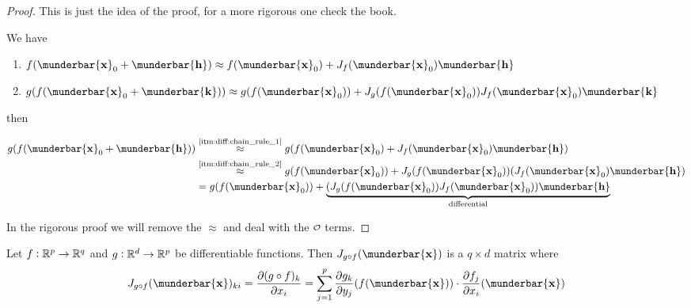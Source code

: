\documentclass[14pt]{extarticle}
\renewcommand{\vec}[1]{\munderbar{\mathbf{#1}}}
\begin{document}
\begin{proof}
    This is just the idea of the proof, for a more rigorous one check the book.

    We have
    \begin{enumerate}[label=(\roman*.)]
        \item \label{itm:diff:chain_rule_1} $f(\vec{x}_0 + \vec{h}) \approx f(\vec{x}_0) + J_f(\vec{x}_0) \vec{h}$
        \item \label{itm:diff:chain_rule_2} $g(f(\vec{x}_0 + \vec{k})) \approx g(f(\vec{x}_0)) + J_g(f(\vec{x}_0)) J_f(\vec{x}_0) \vec{k}$
    \end{enumerate}

    then

    \begin{align}
        g(f(\vec{x}_0 + \vec{h})) & \stackrel{\text{\ref{itm:diff:chain_rule_1}}}{\approx} g(f(\vec{x}_0) + J_f(\vec{x}_0) \vec{h})                     \\
                                  & \stackrel{\text{\ref{itm:diff:chain_rule_2}}}{\approx} g(f(\vec{x}_0)) + J_g(f(\vec{x}_0)) (J_f(\vec{x}_0) \vec{h}) \\
                                  & = g(f(\vec{x}_0)) + \underbrace{(J_g(f(\vec{x}_0)) J_f(\vec{x}_0)) \vec{h}}_{\text{differential}}
    \end{align}

    In the rigorous proof we will remove the $\approx$ and deal with the $\o$ terms.
\end{proof}

\begin{example}
    Let $f: \mathbb{R}^p \to \mathbb{R}^q$ and $g: \mathbb{R}^d \to \mathbb{R}^p$ be differentiable functions.
    Then $J_{g \circ f}(\vec{x})$ is a $q \times d$ matrix where
    \begin{equation}
        J_{g \circ f}(\vec{x})_{ki} =
        \pdv{(g \circ f)_k}{x_i}() = \sum_{j=1}^p \pdv{g_k}{y_j}()(f(\vec{x})) \cdot \pdv{f_j}{x_i}()(\vec{x})
    \end{equation}
\end{example}
\end{document}
